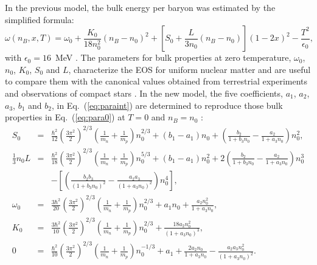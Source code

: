\documentclass[preprint]{revtex4}
\begin{document}
In the  previous model,
the bulk energy per baryon was estimated by the simplified formula: 
\begin{equation}
 \omega(n_B,x,T)= \omega_0 + \frac{K_0}{18 n_0^2} (n_B-n_0)^{2}   + \left[S_0 +\frac{L}{3 n_0}  (n_B-n_0)   \right] (1-2x)^2  - \frac{T^2}{\epsilon_0}  , %
 \label{eq:para0}
\end{equation}
with 
 $\epsilon_0=16$~MeV
\cite{lattimer91,bondorf95}.
The parameters for bulk properties  at zero temperature,  $\omega_0$, $n_0$, $K_0$, $S_0$ and $L$,
characterize the EOS for uniform nuclear matter and  are  useful to compare them with the canonical values obtained from terrestrial experiments and observations of compact stars \cite{oertel17}.  
In the new model, the five coefficients, $a_1$, $a_2$, $a_3$, $b_1$ and $b_2$, in Eq.~(\ref{eq:paraint}) are determined to reproduce those bulk properties in Eq.~(\ref{eq:para0})
at $T=0$ and $n_B=n_0$  \cite{oyamatsu03}: 
\begin{eqnarray}%
\label{eqcoef1}
S_0 &=& \frac{\hbar^2}{12} \left( \frac{3 \pi^2}{2} \right)^{2/3} \left( \frac{1}{m_n}+\frac{1}{m_p} \right)  n_0^{2/3} + (b_1-a_1) n_0 + \left( \frac{b_2}{1+b_3 n_0}  - \frac{a_2}{1+a_3 n_0}  \right) n_0^2  , \\
\label{eqcoef2}
\frac{1}{3}n_0 L &=& \frac{\hbar^2}{18} \left( \frac{3 \pi^2}{2} \right)^{2/3} \left( \frac{1}{m_n}+\frac{1}{m_p} \right)  n_0^{5/3} + (b_1-a_1) n_0^2 + 2 \left( \frac{b_2}{1+b_3 n_0}  - \frac{a_2}{1+a_3 n_0}  \right) n_0^3  \\
& & -\left[ \left( \frac{b_2 b_3}{(1+b_3 n_0)^2} -  \frac{a_2 a_3}{(1+a_3 n_0)^2}  \right) n_0^4  \right] 
\nonumber , \\
\label{eqcoef3}
\omega_0  &=& \frac{3 \hbar^2}{20}  \left( \frac{3 \pi^2}{2} \right)^{2/3} \left( \frac{1}{m_n}+\frac{1}{m_p} \right)  n_0^{2/3}  + a_1 n_0 +  \frac{a_2 n_0^2}{1+a_3 n_0} , \\
\label{eqcoef4}
K_0  &=& \frac{3 \hbar^2}{10}  \left( \frac{3 \pi^2}{2} \right)^{2/3} \left( \frac{1}{m_n}+\frac{1}{m_p} \right)  n_0^{2/3}  +  \frac{18 a_2 n_0^2}{(1+a_3 n_0)^3} , \\
\label{eqcoef5}
0  &=& \frac{\hbar^2}{10}  \left( \frac{3 \pi^2}{2} \right)^{2/3} \left( \frac{1}{m_n}+\frac{1}{m_p} \right)  n_0^{-1/3}  + a_1  +  \frac{2 a_2 n_0}{1+a_3 n_0} - \frac{a_2 a_3 n_0^2}{(1+a_3 n_0)^2}   .
\end{eqnarray}
\end{document}
